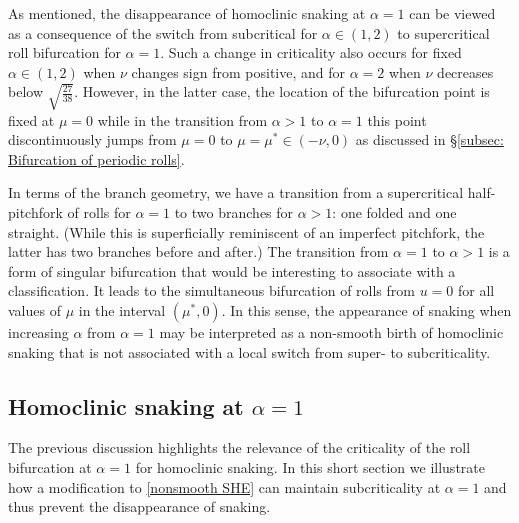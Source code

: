 \documentclass{article}
\numberwithin{equation}{section}
\begin{document}
			
As mentioned, the disappearance of homoclinic snaking at $\alpha = 1$ can be viewed as a consequence of the switch from subcritical for $\alpha\in(1,2)$ to supercritical roll bifurcation for $\alpha=1$. Such a change in criticality also occurs for fixed $\alpha\in(1,2)$ when $\nu$ changes sign from positive, and for $\alpha=2$ when $\nu$ decreases below $\sqrt{\tfrac{27}{38}}$. However, in the latter case, the location of the bifurcation point is fixed at $\mu=0$ while in the transition from $\alpha>1$ to $\alpha=1$ this point discontinuously jumps from $\mu=0$ to $\mu=\mu^*\in (-\nu,0)$ as discussed in \S\ref{subsec: Bifurcation of periodic rolls}. 

In terms of the branch geometry, we have a transition from a supercritical half-pitchfork of rolls for $\alpha=1$  
to two branches for $\alpha>1$: one folded and one straight. (While this is superficially reminiscent of an imperfect pitchfork, the latter has two branches before and after.)  
The transition from $\alpha=1$ to $\alpha>1$ is a form of singular bifurcation that would be interesting to associate with a classification. It leads to the simultaneous bifurcation of rolls from $u=0$ for all values of $\mu$ in the interval $(\mu^*,0)$. In this sense, the appearance of snaking when increasing $\alpha$ from $\alpha=1$ may be interpreted as a non-smooth birth of homoclinic snaking that is not associated with a local switch from super- to subcriticality. 

\subsection{Homoclinic snaking at $\alpha=1$}
\label{subsec: homoclinic snaking at 1}

 The previous discussion highlights the relevance of the criticality of the roll bifurcation at $\alpha=1$ for homoclinic snaking. In this short section we illustrate how a modification to \eqref{nonsmooth SHE} can maintain subcriticality at $\alpha=1$ and thus prevent the disappearance of snaking. 
\end{document}
